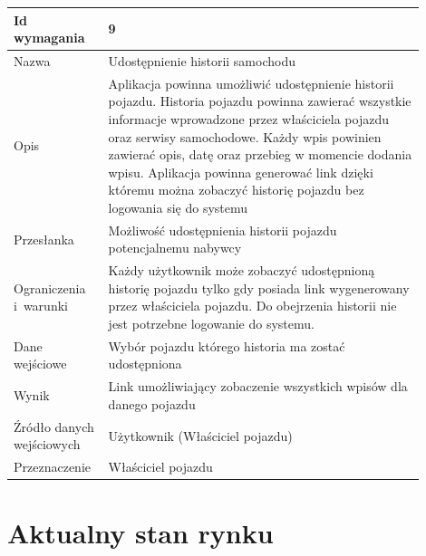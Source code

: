 \documentclass[12pt]{article}
\begin{document}
\begin{table}[H]
\begin{center}
	\begin{tabular}{|p{0.18\linewidth}|p{0.72\linewidth}|}%
	\hline
	Id wymagania 	& 9 				\\ \hline
	Nazwa			& Udostępnienie historii samochodu \\ \hline
	Opis &	Aplikacja powinna umożliwić udostępnienie historii pojazdu. Historia pojazdu powinna zawierać wszystkie informacje wprowadzone przez właściciela pojazdu oraz serwisy samochodowe. Każdy wpis powinien zawierać opis, datę oraz przebieg w momencie dodania wpisu. Aplikacja powinna generować link dzięki któremu można zobaczyć historię pojazdu bez logowania się do systemu \\ \hline
	Przesłanka & Możliwość udostępnienia historii pojazdu potencjalnemu nabywcy   \\ \hline
	Ograniczenia i~warunki & Każdy użytkownik może zobaczyć udostępnioną historię pojazdu tylko gdy posiada link wygenerowany przez właściciela pojazdu. Do obejrzenia historii nie jest potrzebne logowanie do systemu. \\ \hline
	Dane wejściowe &Wybór pojazdu którego historia ma zostać udostępniona \\ \hline
	Wynik & Link umożliwiający zobaczenie wszystkich wpisów dla danego pojazdu\\ \hline
	Źródło danych wejściowych &Użytkownik (Właściciel pojazdu)\\ \hline
	Przeznaczenie & Właściciel pojazdu\\ \hline
	\end{tabular}
\end{center}
\end{table}

\newpage
\section{Aktualny stan rynku }
	
\end{document}
